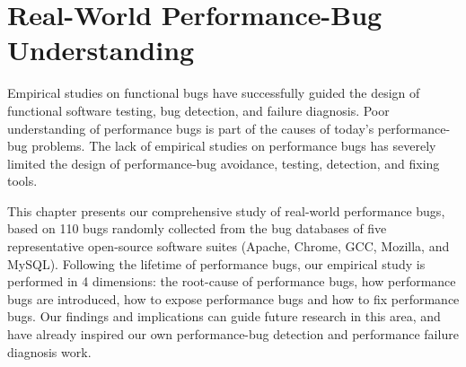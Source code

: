 \chapter[Real-World Performance-Bug Understanding]{Real-World Performance-Bug Understanding}
\label{chap:study}

Empirical studies on functional bugs have successfully guided the design of functional software testing, 
bug detection, and failure diagnosis. 
Poor understanding of performance bugs is part of the causes of today's performance-bug problems. 
The lack of empirical studies on performance bugs has severely 
limited the design of performance-bug avoidance, testing, detection, and fixing tools.

This chapter presents our comprehensive study of real-world performance bugs, 
based on 110 bugs randomly collected from the bug databases of five representative 
open-source software suites (Apache, Chrome, GCC, Mozilla, and MySQL). 
Following the lifetime of performance bugs, our empirical study is performed in 4 dimensions: 
the root-cause of performance bugs, how performance bugs are introduced, 
how to expose performance bugs and how to fix performance bugs. Our findings and implications can guide future research in this area, 
and have already inspired our own performance-bug detection and performance failure diagnosis work. 











%

